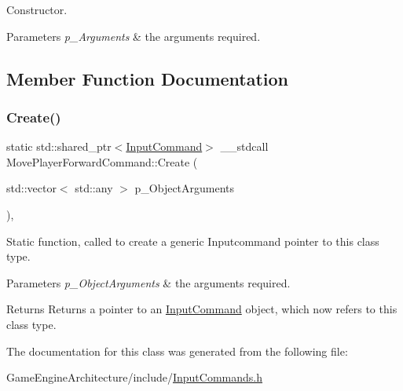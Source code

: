 Constructor. 


\begin{DoxyParams}{Parameters}
{\em p\+\_\+\+Arguments} & the arguments required. \\
\hline
\end{DoxyParams}


\subsection{Member Function Documentation}
\mbox{\label{class_move_player_forward_command_a3a4636b090b0cdd5c37df5285337eb2b}} 
\subsubsection{\texorpdfstring{Create()}{Create()}}
{\footnotesize\ttfamily static std\+::shared\+\_\+ptr$<$\mbox{\hyperlink{class_input_command}{Input\+Command}}$>$ \+\_\+\+\_\+stdcall Move\+Player\+Forward\+Command\+::\+Create (\begin{DoxyParamCaption}\item[{std\+::vector$<$ std\+::any $>$}]{p\+\_\+\+Object\+Arguments }\end{DoxyParamCaption})\hspace{0.3cm}{\ttfamily [inline]}, {\ttfamily [static]}}



Static function, called to create a generic Inputcommand pointer to this class type. 


\begin{DoxyParams}{Parameters}
{\em p\+\_\+\+Object\+Arguments} & the arguments required. \\
\hline
\end{DoxyParams}
\begin{DoxyReturn}{Returns}
Returns a pointer to an \mbox{\hyperlink{class_input_command}{Input\+Command}} object, which now refers to this class type. 
\end{DoxyReturn}


The documentation for this class was generated from the following file\+:\begin{DoxyCompactItemize}
\item 
Game\+Engine\+Architecture/include/\mbox{\hyperlink{_input_commands_8h}{Input\+Commands.\+h}}\end{DoxyCompactItemize}
